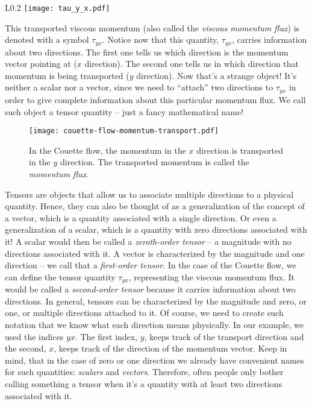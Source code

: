 \documentclass[10pt,twocolumn]{article}
\begin{document}
\begin{wrapfigure}{L}{0.2\textwidth}
\centering\texttt{[image: tau\_y\_x.pdf]}
\label{fig:tau_y_x}
\end{wrapfigure}
This transported viscous momentum (also called the \textit{viscous momentum flux}) is denoted with a symbol $\tau_{yx}$. Notice now that this quantity, $\tau_{yx}$, carries information about two directions. The first one tells us which direction is the momentum vector pointing at ($x$ direction). The second one tells us in which direction that momentum is being transported ($y$ direction). Now that's a strange object! It's neither a scalar nor a vector, since we need to ``attach'' two directions to $\tau_{yx}$ in order to give complete information about this particular momentum flux. We call such object a tensor quantity -- just a fancy mathematical name!
\begin{figure}[t!]
\centering\texttt{[image: couette-flow-momentum-transport.pdf]}
\caption{In the Couette flow, the momentum in the $x$ direction is transported in the $y$ direction. The transported momentum is called the \textit{momentum flux}.}
\label{fig:couette-flow-momentum-transport}
\end{figure}

Tensors are objects that allow us to associate multiple directions to a physical quantity. Hence, they can also be thought of as a generalization of the concept of a vector, which is a quantity associated with a single direction. Or even a generalization of a scalar, which is a quantity with zero directions associated with it! A scalar would then be called a \textit{zeroth-order tensor} -- a magnitude with no directions associated with it. A vector is characterized by the magnitude and one direction -- we call that a \textit{first-order tensor}. In the case of the Couette flow, we can define the tensor quantity $\tau_{yx}$, representing the viscous momentum flux. It would be called a \textit{second-order tensor} because it carries information about two directions. In general, tensors can be characterized by the magnitude and zero, or one, or multiple directions attached to it. Of course, we need to create such notation that we know what each direction means physically. In our example, we used the indices $yx$. The first index, $y$, keeps track of the transport direction and the second, $x$, keeps track of the direction of the momentum vector. Keep in mind, that in the case of zero or one direction we already have convenient names for such quantities: \textit{scalars} and \textit{vectors}. Therefore, often people only bother calling something a tensor when it's a quantity with at least two directions associated with it.
\end{document}
